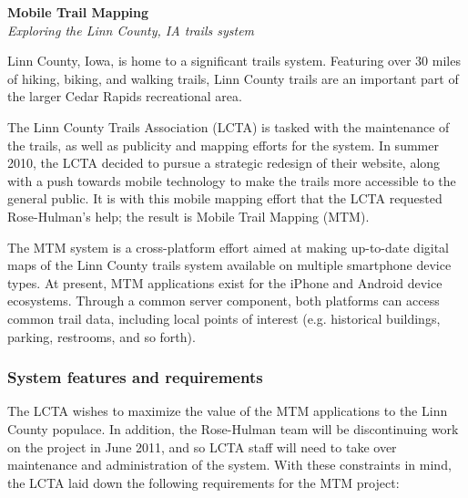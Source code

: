 \documentclass{article}
\begin{document}

\begin{center}
{\large \textbf{Mobile Trail Mapping}} \\
\textit{Exploring the Linn County, IA trails system}
\end{center}

Linn County, Iowa, is home to a significant trails system. Featuring over 30 miles of hiking, biking, and walking trails, Linn County trails are an important part of the larger Cedar Rapids recreational area.

The Linn County Trails Association (LCTA) is tasked with the maintenance of the trails, as well as publicity and mapping efforts for the system. In summer 2010, the LCTA decided to pursue a strategic redesign of their website, along with a push towards mobile technology to make the trails more accessible to the general public. It is with this mobile mapping effort that the LCTA requested Rose-Hulman's help; the result is Mobile Trail Mapping (MTM).

The MTM system is a cross-platform effort aimed at making up-to-date digital maps of the Linn County trails system available on multiple smartphone device types. At present, MTM applications exist for the iPhone and Android device ecosystems. Through a common server component, both platforms can access common trail data, including local points of interest (e.g. historical buildings, parking, restrooms, and so forth).

\subsubsection*{System features and requirements}

The LCTA wishes to maximize the value of the MTM applications to the Linn County populace. In addition, the Rose-Hulman team will be discontinuing work on the project in June 2011, and so LCTA staff will need to take over maintenance and administration of the system. With these constraints in mind, the LCTA laid down the following requirements for the MTM project:
\end{document}
